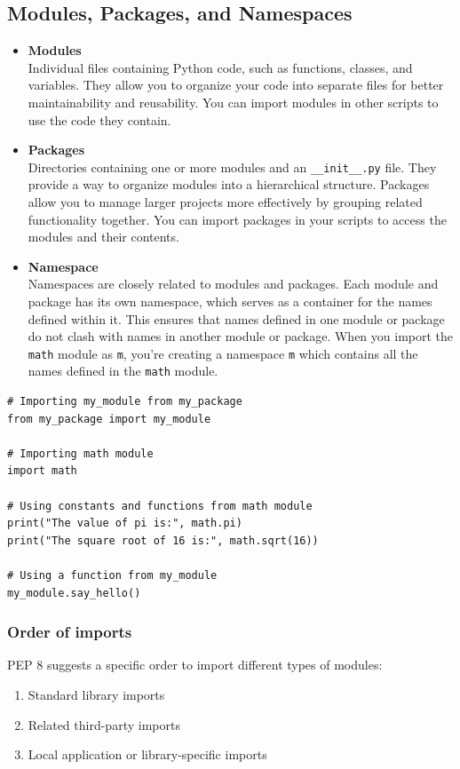 \subsection{Modules, Packages, and Namespaces}
\begin{itemize}
\item \textbf{Modules}\\
Individual files containing Python code, such as functions, classes, and variables. They allow you to organize your code into separate files for better maintainability and reusability. You can import modules in other scripts to use the code they contain.

\item \textbf{Packages}\\
Directories containing one or more modules and an \texttt{\_\_init\_\_.py} file. They provide a way to organize modules into a hierarchical structure. Packages allow you to manage larger projects more effectively by grouping related functionality together. You can import packages in your scripts to access the modules and their contents.

\item \textbf{Namespace}\\
Namespaces are closely related to modules and packages. Each module and package has its own namespace, which serves as a container for the names defined within it. This ensures that names defined in one module or package do not clash with names in another module or package. When you import the \texttt{math} module as \texttt{m}, you're creating a namespace \texttt{m} which contains all the names defined in the \texttt{math} module.
\end{itemize}

\begin{codebox}
\begin{verbatim}
# Importing my_module from my_package
from my_package import my_module

# Importing math module
import math

# Using constants and functions from math module
print("The value of pi is:", math.pi)
print("The square root of 16 is:", math.sqrt(16))

# Using a function from my_module
my_module.say_hello()
\end{verbatim}
\end{codebox}

\subsubsection{Order of imports}
PEP 8 suggests a specific order to import different types of modules:
\begin{enumerate}
    \item Standard library imports
    \item Related third-party imports
    \item Local application or library-specific imports
\end{enumerate}

